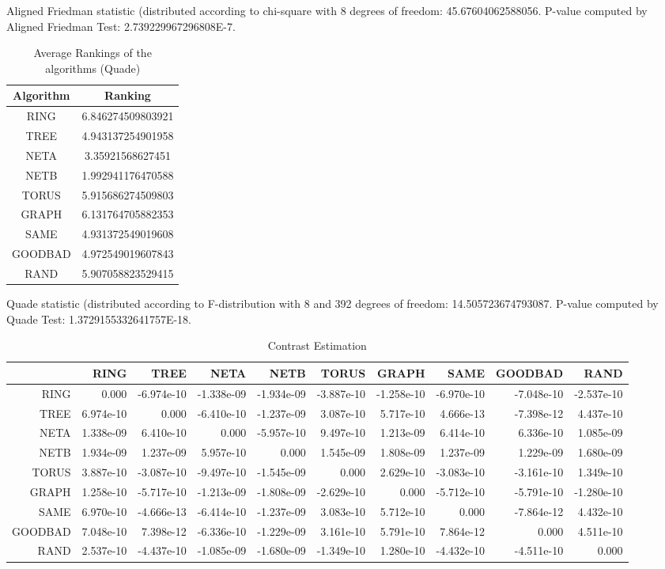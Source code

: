 \documentclass[a4paper,10pt]{article}
\begin{document}
\begin{landscape}
Aligned Friedman statistic (distributed according to chi-square with 8 degrees of freedom: 45.67604062588056. 
P-value computed by Aligned Friedman Test: 2.739229967296808E-7.\newline


\newpage

\begin{table}[!htp]
\centering
\caption{Average Rankings of the algorithms (Quade)
}\begin{tabular}{c|c}
Algorithm&Ranking\\
\hline
 RING&6.846274509803921\\
 TREE&4.943137254901958\\
 NETA&3.35921568627451\\
 NETB&1.992941176470588\\
 TORUS&5.915686274509803\\
 GRAPH&6.131764705882353\\
 SAME&4.931372549019608\\
 GOODBAD&4.972549019607843\\
 RAND&5.907058823529415\\
\end{tabular}
\end{table}
Quade statistic (distributed according to F-distribution with 8 and 392 degrees of freedom: 14.505723674793087. 
P-value computed by Quade Test: 1.3729155332641757E-18.\newline


\newpage

\begin{table}[!htp]
\centering\tiny
\caption{Contrast Estimation}
\begin{tabular}{
|r|r|r|r|r|r|r|r|r|r|}
\hline
 & RING& TREE& NETA& NETB& TORUS& GRAPH& SAME& GOODBAD& RAND\\
\hline
 RING&0.000&-6.974e-10&-1.338e-09&-1.934e-09&-3.887e-10&-1.258e-10&-6.970e-10&-7.048e-10&-2.537e-10\\
\hline
 TREE&6.974e-10&0.000&-6.410e-10&-1.237e-09&3.087e-10&5.717e-10&4.666e-13&-7.398e-12&4.437e-10\\
\hline
 NETA&1.338e-09&6.410e-10&0.000&-5.957e-10&9.497e-10&1.213e-09&6.414e-10&6.336e-10&1.085e-09\\
\hline
 NETB&1.934e-09&1.237e-09&5.957e-10&0.000&1.545e-09&1.808e-09&1.237e-09&1.229e-09&1.680e-09\\
\hline
 TORUS&3.887e-10&-3.087e-10&-9.497e-10&-1.545e-09&0.000&2.629e-10&-3.083e-10&-3.161e-10&1.349e-10\\
\hline
 GRAPH&1.258e-10&-5.717e-10&-1.213e-09&-1.808e-09&-2.629e-10&0.000&-5.712e-10&-5.791e-10&-1.280e-10\\
\hline
 SAME&6.970e-10&-4.666e-13&-6.414e-10&-1.237e-09&3.083e-10&5.712e-10&0.000&-7.864e-12&4.432e-10\\
\hline
 GOODBAD&7.048e-10&7.398e-12&-6.336e-10&-1.229e-09&3.161e-10&5.791e-10&7.864e-12&0.000&4.511e-10\\
\hline
 RAND&2.537e-10&-4.437e-10&-1.085e-09&-1.680e-09&-1.349e-10&1.280e-10&-4.432e-10&-4.511e-10&0.000\\
\hline


\end{tabular}
\end{table}
\end{landscape}
\end{document}
